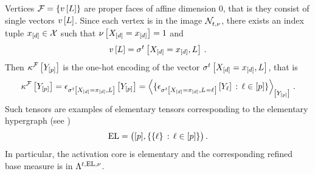\begin{example}[Vertices]
    \label{exa:vertexMeasures}
    Vertices $\mathcal{F}=\{v\left[L\right]\}$ are proper faces of affine dimension $0$, that is they consist of single vectors $v\left[L\right]$.
    Since each vertex is in the image $\mathcal{N}_{t,\nu}^{}$, there exists an index tuple $x_{[d]}\in\mathcal{X}$ such that $\nu\left[X_{[d]}=x_{[d]}\right]=1$ and
    \begin{align*}
        v\left[L\right]
        = \sigma^{t}\left[X_{[d]}=x_{[d]},L\right] \, .
    \end{align*}
    Then $\kappa^{\mathcal{F}}\left[Y_{[p]}\right]$ is the one-hot encoding of the vector $\sigma^{t}\left[X_{[d]}=x_{[d]},L\right]$, that is
    \begin{align*}
        \kappa^{\mathcal{F}}\left[Y_{[p]}\right]
        = \epsilon_{\sigma^{t}\left[X_{[d]}=x_{[d]},L\right]}\left[Y_{[p]}\right]
        = \left\langle \{\epsilon_{\sigma^{t}\left[X_{[d]}=x_{[d]},L_{}=\ell_{}\right]}\left[Y_{\ell}\right]\,:\,\ell\in[p]\}\right\rangle_{\left[ Y_{[p]} \right]}\, .
    \end{align*}
    Such tensors are examples of elementary tensors corresponding to the elementary hypergraph (see )
    \begin{align*}
        \mathrm{EL}
        = \big([p],\{\{\ell\}\,:\,\ell\in[p]\}\big) \, .
    \end{align*}
    In particular, the activation core is elementary and the corresponding refined base measure is in $\Lambda^{t,\mathrm{EL},\nu}$.
\end{example}